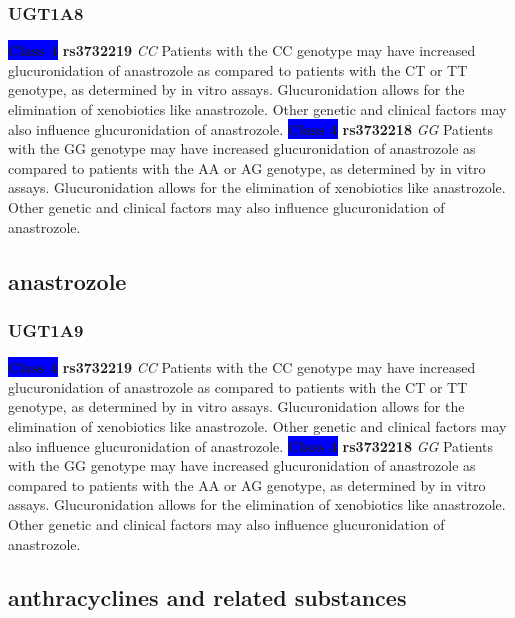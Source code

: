 \documentclass{book}
\begin{document}
\subsubsection{ UGT1A8 }

\begin{center}

\textbf{\colorbox{blue} {Class 4}} \textbf{ rs3732219 } \textit{ CC }
Patients with the CC genotype may have increased glucuronidation of anastrozole as compared to patients with the CT or TT genotype, as determined by in vitro assays. Glucuronidation allows for the elimination of xenobiotics like anastrozole. Other genetic and clinical factors may also influence glucuronidation of anastrozole. \textbf{\colorbox{blue} {Class 4}} \textbf{ rs3732218 } \textit{ GG }
Patients with the GG genotype may have increased glucuronidation of anastrozole as compared to patients with the AA or AG genotype, as determined by in vitro assays. Glucuronidation allows for the elimination of xenobiotics like anastrozole. Other genetic and clinical factors may also influence glucuronidation of anastrozole.

\end{center}\subsection{ anastrozole }


\subsubsection{ UGT1A9 }

\begin{center}

\textbf{\colorbox{blue} {Class 4}} \textbf{ rs3732219 } \textit{ CC }
Patients with the CC genotype may have increased glucuronidation of anastrozole as compared to patients with the CT or TT genotype, as determined by in vitro assays. Glucuronidation allows for the elimination of xenobiotics like anastrozole. Other genetic and clinical factors may also influence glucuronidation of anastrozole. \textbf{\colorbox{blue} {Class 4}} \textbf{ rs3732218 } \textit{ GG }
Patients with the GG genotype may have increased glucuronidation of anastrozole as compared to patients with the AA or AG genotype, as determined by in vitro assays. Glucuronidation allows for the elimination of xenobiotics like anastrozole. Other genetic and clinical factors may also influence glucuronidation of anastrozole.

\end{center}\subsection{ anthracyclines and related substances }
\end{document}
